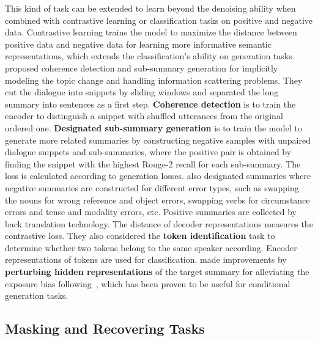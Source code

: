 This kind of task can be extended to learn beyond the denoising ability when 
combined with contrastive learning or classification tasks on positive and negative data. 
Contrastive learning trains the model to maximize 
the distance between positive data and negative data for learning more informative semantic representations, which extends the classification's ability on generation tasks.
\citet{liu2021topic} 
proposed {coherence detection} and {sub-summary generation} 
for implicitly modeling the topic change and handling information scattering 
problems. They cut the dialogue into snippets by sliding windows and 
separated the long summary into sentences as a first step.
\textbf{Coherence detection} is to train the encoder to distinguish 
a snippet with shuffled utterances from the original ordered one.
\textbf{Designated sub-summary generation} is to train the model to generate more related 
summaries by constructing negative samples with unpaired dialogue 
snippets and sub-summaries, where the positive pair is obtained 
by finding the snippet with the highest Rouge-2 recall for each sub-summary.
The loss is calculated according to generation losses.
\citet{tang2021confit} also designated summaries where negative summaries are constructed for different error types, such as swapping the nouns for wrong reference and object errors, swapping verbs for circumstance errors and tense and modality errors, etc. Positive summaries are collected by back translation technology. The distance of decoder representations measures the contrastive loss.
They also considered the \textbf{token identification} task to determine whether two tokens belong to the same speaker according. Encoder representations of tokens are used for classification.
\citet{zhao2021give} made improvements by \textbf{perturbing hidden representations} of 
the target summary for alleviating the exposure bias following~\citet{lee2020contrastive}, which has been proven to be useful for conditional generation tasks.

\subsection{Masking and Recovering Tasks} 

